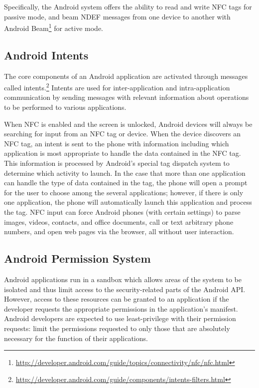 \documentclass[12pt]{article}
\begin{document}
Specifically, the Android system offers the ability to read and write NFC tags for passive mode, and beam NDEF messages from one device to another with Android Beam\footnote{\url{http://developer.android.com/guide/topics/connectivity/nfc/nfc.html}} for active mode. 

\subsection{Android Intents}
The core components of an Android application are activated through messages called intents.\footnote{\url{http://developer.android.com/guide/components/intents-filters.html}}
Intents are used for inter-application and intra-application communication by sending messages with relevant information about operations to be performed to various applications.  

When NFC is enabled and the screen is unlocked, Android devices will always be searching for input from an NFC tag or device. 
When the device discovers an NFC tag, an intent is sent to the phone with information including which application is most appropriate to handle the data contained in the NFC tag.
This information is processed by Android's special tag dispatch system to determine which activity to launch.
In the case that more than one application can handle the type of data contained in the tag, the phone will open a prompt for the user to choose among the several applications; however, if there is only one application, the phone will automatically launch this application and process the tag.
NFC input can force Android phones (with certain settings) to parse images, videos, contacts, and office documents, call or text arbitrary phone numbers, and open web pages via the browser, all without user interaction.  

\subsection{Android Permission System}
Android applications run in a sandbox which allows areas of the system to be isolated and thus limit access to the security-related parts of the Android API.
However, access to these resources can be granted to an application if the developer requests the appropriate permissions in the application's manifest.
Android developers are expected to use least-privilege with their permission requests: limit the permissions requested to only those that are absolutely necessary for the function of their applications. 
\end{document}

